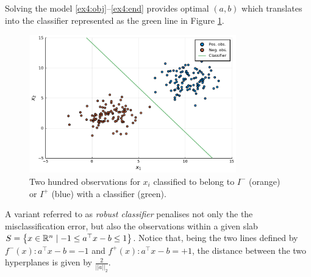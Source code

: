 Solving the model \eqref{ex4:obj}--\eqref{ex4:end} provides optimal $(a,b)$ which translates into the classifier represented as the green line in Figure \ref{fig:observations_with_classifier}.

\begin{figure}[h]
    \includegraphics[width=0.8\textwidth]{figures/part_2_chapter_1/classes_with_classifier.pdf}
    \caption{Two hundred observations for $x_i$ classified to belong to $I^-$ (orange) or $I^+$ (blue) with a classifier (green).}        
    \label{fig:observations_with_classifier}
\end{figure}
 
A variant referred to as \emph{robust classifier} penalises not only the the misclassification error, but also the observations within a given slab $S = \left\{ x \in \mathbb{R}^n \mid -1 \leq a^\top x - b \leq 1 \right \}$. Notice that, being the two lines defined by $f^-(x) : a^\top x - b = -1$ and $f^+(x) : a^\top x - b = +1$, the distance between the two hyperplanes is given by $\frac{2}{||a||_2}$. 

